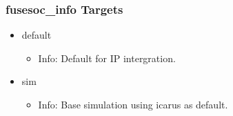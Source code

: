 \subsubsection{fusesoc\_info Targets}
\begin{itemize}
\item default
	\begin{itemize}
	\item[$\space$] Info: Default for IP intergration.
	\end{itemize}
\item sim
	\begin{itemize}
	\item[$\space$] Info: Base simulation using icarus as default.
	\end{itemize}
\end{itemize}
